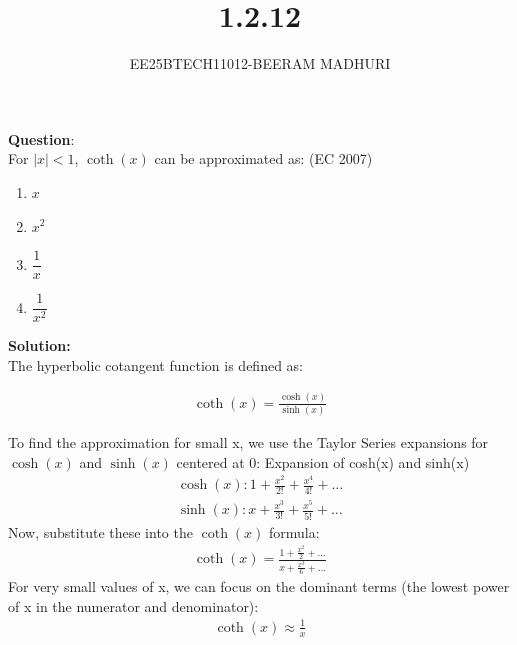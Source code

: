 \documentclass[journal]{IEEEtran}
\begin{document}

\vspace{3cm}

\title{1.2.12}
\author{EE25BTECH11012-BEERAM MADHURI}
{\let\newpage\relax\maketitle}

\renewcommand{\thefigure}{\theenumi}
\renewcommand{\thetable}{\theenumi}
\setlength{\intextsep}{10pt} %


\renewcommand{\thetable}{\theenumi}


\textbf{Question}:\\
For $|x| < 1$, $\coth(x)$ can be approximated as: \hfill (EC 2007)

\begin{enumerate}
    \item[a)] $x$
    \item[b)] $x^2$
    \item[c)] $\dfrac{1}{x}$
    \item[d)] $\dfrac{1}{x^2}$
\end{enumerate}


\textbf{Solution:}\\
The hyperbolic cotangent function is defined as:

\begin{align}
    \coth(x) = \frac{\cosh(x)}{\sinh(x)}
\end{align}

To find the approximation for small x, we use the Taylor Series expansions for $\cosh(x)$ and $\sinh(x)$ centered at 0:
Expansion of cosh(x) and sinh(x)
\begin{align}
    \cosh(x): 1 + \frac{x^2}{2!} + \frac{x^4}{4!} + \dots\\
    \sinh(x): x + \frac{x^3}{3!} + \frac{x^5}{5!} + \dots
\end{align}
Now, substitute these into the $\coth(x)$ formula:
\begin{align}
    \coth(x) = \frac{1 + \frac{x^2}{2} + \dots}{x + \frac{x^3}{6} + \dots}
\end{align}
For very small values of x, we can focus on the dominant terms (the lowest power of x in the numerator and denominator):
\begin{align}
    \coth(x) \approx \frac{1}{x}
\end{align}
\end{document}
